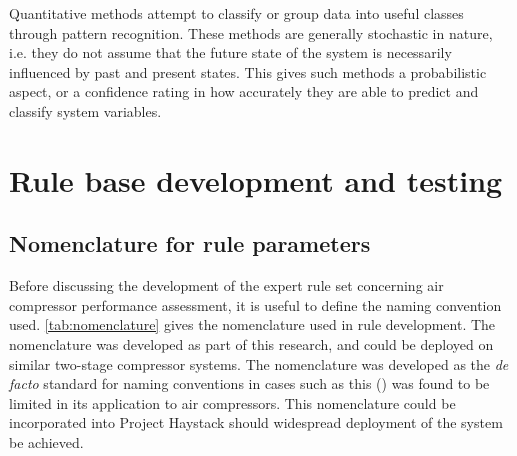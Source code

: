 Quantitative methods attempt to classify or group data into useful classes through pattern recognition. These methods are generally stochastic in nature, i.e. they do not assume that the future state of the system is necessarily influenced by past and present states. This gives such methods a probabilistic aspect, or a confidence rating in how accurately they are able to predict and classify system variables.

\section{Rule base development and testing}
\label{sec:rules}

\subsection{Nomenclature for rule parameters}
\label{subsec:nomenclature}
Before discussing the development of the expert rule set concerning air compressor performance assessment, it is useful to define the naming convention used. \autoref{tab:nomenclature} gives the nomenclature used in rule development. The nomenclature was developed as part of this research, and could be deployed on similar two-stage compressor systems. The nomenclature was developed as the \textit{de facto} standard for naming conventions in cases such as this (\cite{ProjectHaystack2016}) was found to be limited in its application to air compressors. This nomenclature could be incorporated into Project Haystack should widespread deployment of the system be achieved.

